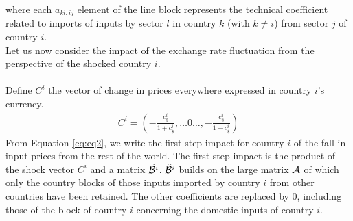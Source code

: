 \documentclass[11pt,a4paper]{paper} %
\begin{document}
where each $a_{kl,ij}$ element of the line block represents the technical coefficient related to imports of inputs by sector $l$ in country $k$ (with $k\ne i$) from sector $j$ of country $i$.\\
Let us now consider the impact of the exchange rate fluctuation from the perspective of the shocked country $i$.\\
\\%
%
%
%
Define $C^i$ the vector of change in prices everywhere expressed in country $i$'s currency.\\
\begin{eqnarray*}
C^i = \left(-\frac{c_\$^i}{1+c_\$^i},\ldots0\ldots,-\frac{c_\$^i}{1+c_\$^i} \right)
\end{eqnarray*}
From Equation \ref{eq:eq2}, we write the first-step impact for country $i$ of the fall in input prices from the rest of the world. 
The first-step impact is the product of the shock vector $C^i$ and a matrix ${\tilde{{\cal B}^i}}$. ${\tilde{{\cal B}^i}}$ builds on the large matrix ${\cal A}$ of which only the country blocks of those inputs imported by country $i$ from other countries have been retained. 
The other coefficients are replaced by 0, including those of the block of country $i$ concerning the domestic inputs of country $i$. \\
\end{document}
